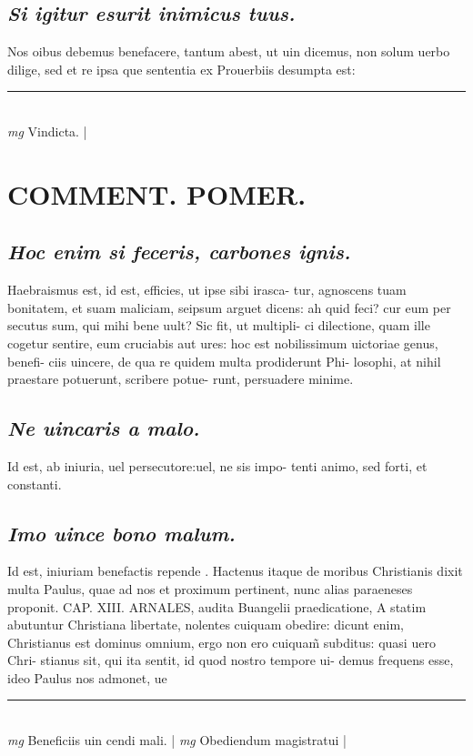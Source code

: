 \documentclass{article}
\begin{document}
\begin{pages}
\subsection*{\textit{Si igitur esurit inimicus tuus. }}\pstart Nos oibus debemus benefacere, tantum abest, ut uin dicemus, non solum uerbo dilige, sed et re ipsa que sententia ex Prouerbiis desumpta est:  \pend
\vspace{0.5cm}\noindent
\vspace{0.2cm}\rule{1cm}{0.2pt}\\ 
\hspace{0.2cm}\textit{mg}
\footnotesize Vindicta.  
\normalsize| 
\section*{COMMENT. POMER.  }
{}
\subsection*{\textit{Hoc enim si feceris, carbones ignis. }}\pstart Haebraismus est, id est, efficies, ut ipse sibi irasca- tur, agnoscens tuam bonitatem, et suam maliciam, seipsum arguet dicens: ah quid feci? cur eum per secutus sum, qui mihi bene uult? Sic fit, ut multipli- ci dilectione, quam ille cogetur sentire, eum cruciabis aut ures: hoc est nobilissimum uictoriae genus, benefi- ciis uincere, de qua re quidem multa prodiderunt Phi- losophi, at nihil praestare potuerunt, scribere potue- runt, persuadere minime.  \pend
{}
{}
\subsection*{\textit{Ne uincaris a malo. }}\pstart Id est, ab iniuria, uel persecutore:uel, ne sis impo- tenti animo, sed forti, et constanti.  \pend
{}
{}
\subsection*{\textit{Imo uince bono malum. }}\pstart Id est, iniuriam benefactis repende . Hactenus itaque de moribus Christianis dixit multa Paulus, quae ad nos et proximum pertinent, nunc alias paraeneses proponit.   \pend\pstart CAP. XIII.  \pend\pstart ARNALES, audita Buangelii praedicatione, A statim abutuntur Christiana libertate, nolentes cuiquam obedire: dicunt enim, Christianus est dominus omnium, ergo non ero cuiquam̃ subditus: quasi uero Chri- stianus sit, qui ita sentit, id quod nostro tempore ui- demus frequens esse, ideo Paulus nos admonet, ue  \pend
\vspace{0.5cm}\noindent
\vspace{0.2cm}\rule{1cm}{0.2pt}\\ 
\hspace{0.2cm}\textit{mg}
\footnotesize Beneficiis uin cendi mali. 
\normalsize| 
\hspace{0.2cm}\textit{mg}
\footnotesize Obediendum magistratui 
\normalsize| 

\end{pages}
\end{document}
